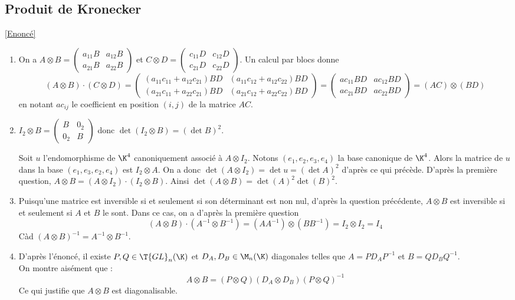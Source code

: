 \documentclass[8pt]{book}
\begin{document}
	\subsection{Produit de Kronecker }
	\label{Produit de Kronecker corrigé}
	\textcolor{blue}{\hyperref[Produit de Kronecker]{[Enoncé]}}\\
	\begin{enumerate}
		\item On a $A \otimes B = \begin{pmatrix}
			a_{11}B & a_{12}B \\
			a_{21}B & a_{22}B
		\end{pmatrix}$ et $C \otimes D = \begin{pmatrix}
			c_{11}D & c_{12}D \\
			c_{21}D & c_{22}D
		\end{pmatrix}$. Un calcul par blocs donne
		$$(A \otimes B) \cdot (C \otimes D) = \begin{pmatrix}
			(a_{11}c_{11} + a_{12}c_{21})BD & (a_{11}c_{12} + a_{12}c_{22})BD \\
			(a_{21}c_{11} + a_{22}c_{21})BD & (a_{21}c_{12} + a_{22}c_{22})BD
		\end{pmatrix} = \begin{pmatrix}
			ac_{11}BD & ac_{12}BD \\
			ac_{21}BD & ac_{22}BD
		\end{pmatrix} = (AC) \otimes (BD)$$
		en notant $ac_{ij}$ le coefficient en position $(i, j)$ de la matrice $AC$.
		\item $I_2 \otimes B = \begin{pmatrix}
			B & 0_2 \\
			0_2 & B
		\end{pmatrix}$ donc $\det(I_2 \otimes B) = (\det B)^2$.
		
		Soit $u$ l'endomorphisme de $\K^4$ canoniquement associé à $A \otimes I_2$. Notons $(e_1, e_2, e_3, e_4)$ la base canonique de $\K^4$. Alors la matrice de $u$ dans la base $(e_1, e_3, e_2, e_4)$ est $I_2 \otimes A$. On a donc $\det(A \otimes I_2) = \det u = (\det A)^2$ d'après ce qui précède. D'après la première question, $A \otimes B = (A \otimes I_2) \cdot (I_2 \otimes B)$. Ainsi $\det(A \otimes B) = \det(A)^2 \det(B)^2$.
		\item Puisqu'une matrice est inversible si et seulement si son déterminant est non nul, d'après la question précédente, $A\otimes B$ est inversible si et seulement si $A$ et $B$ le sont. Dans ce cas, on a d'après la première question
		$$(A \otimes B) \cdot (A^{-1} \otimes B^{-1}) = (AA^{-1}) \otimes (BB^{-1}) = I_2 \otimes I_2 = I_4$$
		Càd $(A\otimes B)^{-1}=A^{-1}\otimes B^{-1}$.
		\item D'après l'énoncé, il existe $P,Q \in \T{GL}_n(\K)$ et $D_A , D_B \in \M_n(\K)$ diagonales telles que $A=PD_AP^{-1}$ et $B=QD_BQ^{-1}$.\\
		On montre aisément que : $$A\otimes B=(P\otimes Q)(D_A\otimes D_B)(P\otimes Q)^{-1}$$
		Ce qui justifie que $A\otimes B$ est diagonalisable.	 
	\end{enumerate}
\end{document}
